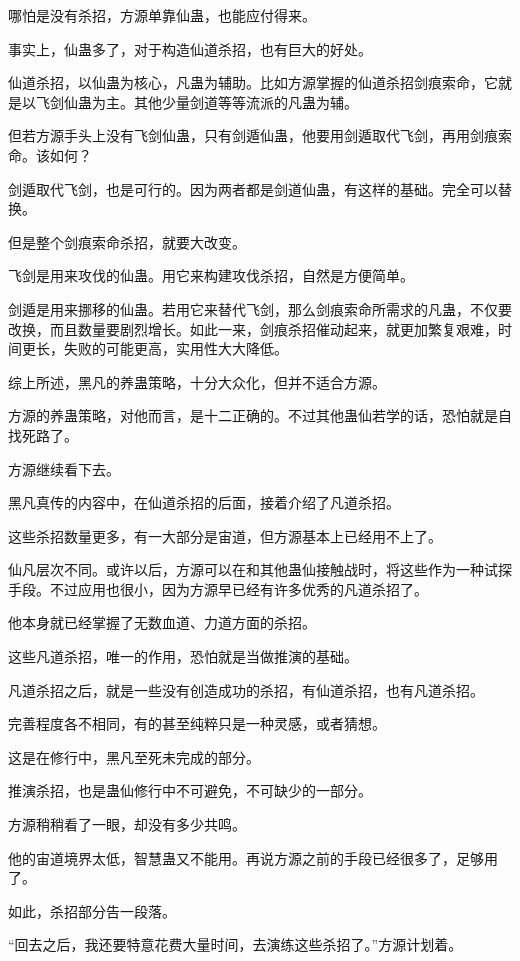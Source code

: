\begin{this_body}
哪怕是没有杀招，方源单靠仙蛊，也能应付得来。

事实上，仙蛊多了，对于构造仙道杀招，也有巨大的好处。

仙道杀招，以仙蛊为核心，凡蛊为辅助。比如方源掌握的仙道杀招剑痕索命，它就是以飞剑仙蛊为主。其他少量剑道等等流派的凡蛊为辅。

但若方源手头上没有飞剑仙蛊，只有剑遁仙蛊，他要用剑遁取代飞剑，再用剑痕索命。该如何？

剑遁取代飞剑，也是可行的。因为两者都是剑道仙蛊，有这样的基础。完全可以替换。

但是整个剑痕索命杀招，就要大改变。

飞剑是用来攻伐的仙蛊。用它来构建攻伐杀招，自然是方便简单。

剑遁是用来挪移的仙蛊。若用它来替代飞剑，那么剑痕索命所需求的凡蛊，不仅要改换，而且数量要剧烈增长。如此一来，剑痕杀招催动起来，就更加繁复艰难，时间更长，失败的可能更高，实用性大大降低。

综上所述，黑凡的养蛊策略，十分大众化，但并不适合方源。

方源的养蛊策略，对他而言，是十二正确的。不过其他蛊仙若学的话，恐怕就是自找死路了。

方源继续看下去。

黑凡真传的内容中，在仙道杀招的后面，接着介绍了凡道杀招。

这些杀招数量更多，有一大部分是宙道，但方源基本上已经用不上了。

仙凡层次不同。或许以后，方源可以在和其他蛊仙接触战时，将这些作为一种试探手段。不过应用也很小，因为方源早已经有许多优秀的凡道杀招了。

他本身就已经掌握了无数血道、力道方面的杀招。

这些凡道杀招，唯一的作用，恐怕就是当做推演的基础。

凡道杀招之后，就是一些没有创造成功的杀招，有仙道杀招，也有凡道杀招。

完善程度各不相同，有的甚至纯粹只是一种灵感，或者猜想。

这是在修行中，黑凡至死未完成的部分。

推演杀招，也是蛊仙修行中不可避免，不可缺少的一部分。

方源稍稍看了一眼，却没有多少共鸣。

他的宙道境界太低，智慧蛊又不能用。再说方源之前的手段已经很多了，足够用了。

如此，杀招部分告一段落。

“回去之后，我还要特意花费大量时间，去演练这些杀招了。”方源计划着。


\end{this_body}
